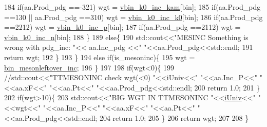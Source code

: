 \begin{DoxyCode}
184         \textcolor{keywordflow}{if}(aa.Prod\_pdg ==-321) wgt = \hyperlink{class_neutrino_flux_reweight_1_1_thin_target_meson_incident_reweighter_ad783e52b4a6206cbb7276d4d168b4807}{vbin\_k0\_inc\_kam}[bin];
185         \textcolor{keywordflow}{if}(aa.Prod\_pdg ==130 || aa.Prod\_pdg ==310) wgt = \hyperlink{class_neutrino_flux_reweight_1_1_thin_target_meson_incident_reweighter_a965f246458feafcee2f9931b2678efd8}{vbin\_k0\_inc\_k0}[bin];
186         \textcolor{keywordflow}{if}(aa.Prod\_pdg ==2212) wgt = \hyperlink{class_neutrino_flux_reweight_1_1_thin_target_meson_incident_reweighter_a4504e9d8374cd8c8c631d25ceaf35a9d}{vbin\_k0\_inc\_p}[bin];
187         \textcolor{keywordflow}{if}(aa.Prod\_pdg ==2112) wgt = \hyperlink{class_neutrino_flux_reweight_1_1_thin_target_meson_incident_reweighter_a406b7314c117edd343d2d9418b48262f}{vbin\_k0\_inc\_n}[bin];   
188       \}
189       \textcolor{keywordflow}{else}\{
190         std::cout<<\textcolor{stringliteral}{"MESINC Something is wrong with pdg\_inc: "}<< aa.Inc\_pdg  <<\textcolor{stringliteral}{" "}<<aa.Prod\_pdg<<std::endl;
191         \textcolor{keywordflow}{return} wgt;
192       \}
193     \}
194     \textcolor{keywordflow}{else} \textcolor{keywordflow}{if}(is\_mesoninc)\{
195       wgt = \hyperlink{class_neutrino_flux_reweight_1_1_thin_target_meson_incident_reweighter_af8a00936922518cafeca2199c385c3f8}{bin\_mesonleftover\_inc};
196     \}
197     
198     \textcolor{keywordflow}{if}(wgt<0)\{
199       \textcolor{comment}{//std::cout<<"TTMESONINC check wgt(<0) "<<iUniv<<" "<<aa.Inc\_P<<" "<<aa.xF<<" "<<aa.Pt<<"
       "<<aa.Prod\_pdg<<std::endl;}
200       \textcolor{keywordflow}{return} 1.0;
201     \}
202     \textcolor{keywordflow}{if}(wgt>10)\{
203       std::cout<<\textcolor{stringliteral}{"BIG WGT IN TTMESONINC "}<<\hyperlink{class_neutrino_flux_reweight_1_1_thin_target_meson_incident_reweighter_aba895e921936f33c25a89daa18c1bf5d}{iUniv}<<\textcolor{stringliteral}{" "}<<wgt<<\textcolor{stringliteral}{" "}<<aa.Inc\_P<<\textcolor{stringliteral}{" "}<<aa.xF<<\textcolor{stringliteral}{" "}<<aa.Pt<<\textcolor{stringliteral}{" "}
      <<aa.Prod\_pdg<<std::endl;
204       \textcolor{keywordflow}{return} 1.0;
205     \}
206     \textcolor{keywordflow}{return} wgt;
207 
208   \}
\end{DoxyCode}
